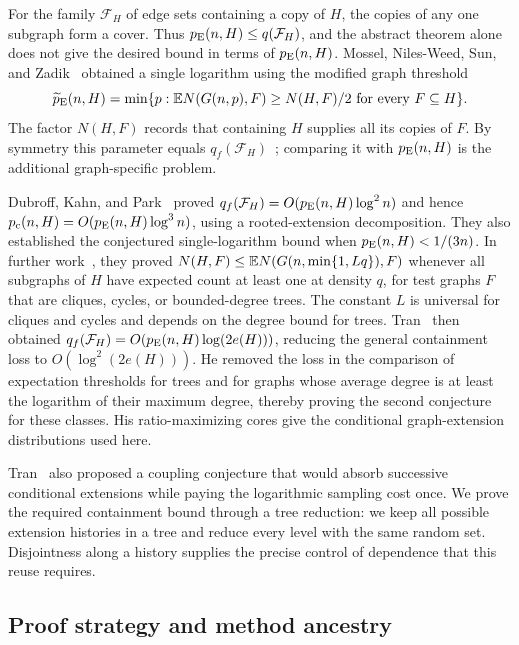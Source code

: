 For the family $\mathcal F_H$ of edge sets containing a copy of $H$,
the copies of any one subgraph form a cover. Thus
$p_{\mathrm E}(n,H)\le q(\mathcal F_H)$, and the abstract theorem alone does
not give the desired bound in terms of $p_{\mathrm E}(n,H)$.
Mossel, Niles-Weed, Sun, and Zadik~\cite[Theorem~1]{MNSZ22} obtained
a single logarithm using the modified graph threshold
\[
 \widetilde p_{\mathrm E}(n,H)
 =\min\{p:\mathbb E N(G(n,p),F)\ge N(H,F)/2
                  \text{ for every }F\subseteq H\}.
\]
The factor $N(H,F)$ records that containing $H$ supplies all its
copies of $F$. By symmetry this parameter equals
$q_f(\mathcal F_H)$~\cite[Equation~(1)]{DKP25}; comparing it with
$p_{\mathrm E}(n,H)$ is the additional graph-specific problem.

Dubroff, Kahn, and Park~\cite[Theorems~1.2--1.5]{DKP25} proved
$q_f(\mathcal F_H)=O(p_{\mathrm E}(n,H)\log^2 n)$ and hence
$p_{\mathrm c}(n,H)=O(p_{\mathrm E}(n,H)\log^3 n)$, using a rooted-extension
decomposition. They also established the conjectured single-logarithm
bound when $p_{\mathrm E}(n,H)<1/(3n)$.
In further work~\cite[Theorems~1.4--1.5]{DKP25Cases}, they proved
$N(H,F)\le\mathbb E N(G(n,\min\{1,Lq\}),F)$ whenever all subgraphs of $H$ have
expected count at least one at density $q$, for test graphs $F$ that
are cliques, cycles, or bounded-degree trees. The constant $L$ is
universal for cliques and cycles and depends on the degree bound
for trees.
Tran~\cite{Tran26} then obtained
$q_f(\mathcal F_H)=O(p_{\mathrm E}(n,H)\log(2e(H)))$, reducing the general
containment loss to $O(\log^2(2e(H)))$. He removed the loss in the
comparison of expectation thresholds for trees and for graphs whose
average degree is at least the logarithm of their maximum degree,
thereby proving the second conjecture for these classes.
His ratio-maximizing cores give the conditional graph-extension
distributions used here.

Tran~\cite[Section~4]{Tran26} also proposed a coupling conjecture
that would absorb successive conditional extensions while paying the
logarithmic sampling cost once. We prove the required containment
bound through a tree reduction: we keep all possible extension histories
in a tree and reduce every level with the same random set. Disjointness along a
history supplies the precise control of dependence that this reuse
requires.

\subsection{Proof strategy and method ancestry}

